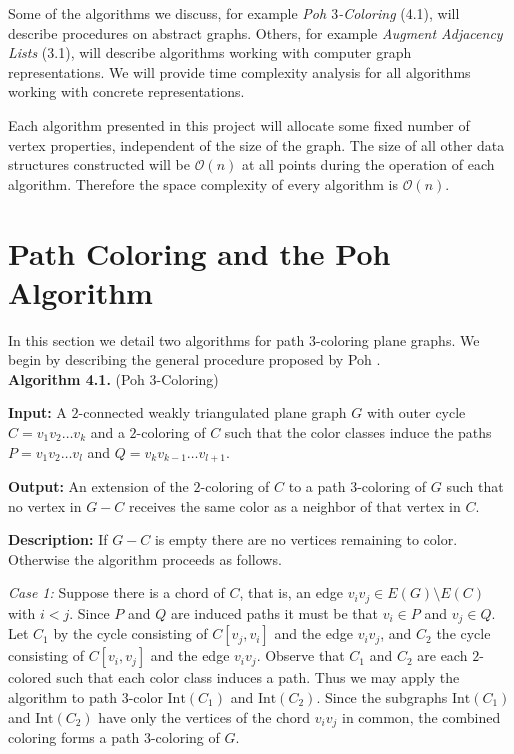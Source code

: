 \documentclass[letterpaper, 12pt]{article}
\theoremstyle{thm}
\begin{document}
Some of the algorithms we discuss, for example \textit{Poh $3$-Coloring} (4.1), will
describe procedures on abstract graphs. Others, for example
\textit{Augment Adjacency Lists} (3.1), will describe algorithms
working with computer graph representations. We will provide time complexity
analysis for all algorithms working with concrete representations.

Each algorithm presented in this project will allocate some fixed number
of vertex properties, independent of the size of the graph. The size of all
other data structures constructed will be $\mathcal{O}(n)$ at all points during
the operation of each algorithm. Therefore the space complexity of every
algorithm is $\mathcal{O}(n)$.


\section{Path Coloring and the Poh Algorithm}

In this section we detail two algorithms for path $3$-coloring plane graphs. We
begin by describing the general procedure proposed by Poh \cite{poh}.\\

\noindent\textbf{Algorithm 4.1.} (Poh $3$-Coloring)

\noindent\textbf{Input:} A $2$-connected weakly triangulated plane graph $G$
with outer cycle $C=v_1v_2\ldots v_k$ and a $2$-coloring of $C$ such that the
color classes induce the paths $P=v_1v_2\ldots v_l$ and
$Q=v_{k}v_{k-1}\ldots v_{l+1}$.

\noindent\textbf{Output:} An extension of the $2$-coloring of $C$ to
a path $3$-coloring of $G$ such that no vertex in $G-C$ receives the same color
as a neighbor of that vertex in $C$.

\noindent\textbf{Description:} If $G-C$ is empty there are no vertices remaining
to color. Otherwise the algorithm proceeds as follows.

\textit{Case 1:} Suppose there is a chord of $C$, that is, an edge
$v_iv_j\in E(G)\setminus E(C)$
with $i<j$. Since $P$ and $Q$ are induced paths it must be that $v_i\in P$ and
$v_j\in Q$. Let $C_1$ by the cycle consisting of $C[v_j,v_i]$ and the
edge $v_iv_j$, and $C_2$ the cycle consisting of $C[v_i,v_j]$ and the edge
$v_iv_j$. Observe that $C_1$ and $C_2$ are each $2$-colored
such that each color class induces a path. Thus we may apply the algorithm to
path $3$-color $\text{Int}(C_1)$ and $\text{Int}(C_2)$. Since the subgraphs
$\text{Int}(C_1)$ and $\text{Int}(C_2)$ have only the vertices of the chord
$v_iv_j$ in common, the combined coloring forms a path $3$-coloring of $G$.
\end{document}
